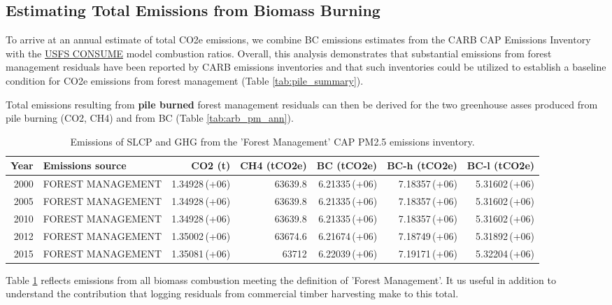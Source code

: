 \documentclass[a4paper,titlepage]{article}
\begin{document}
\subsection{Estimating Total Emissions from Biomass Burning}
\label{sec:orgheadline9}
\label{sec:pile_emissions}

To arrive at an annual estimate of total \ac{CO2e} emissions, we combine \ac{BC} emissions estimates from the \ac{CARB} \ac{CAP} Emissions Inventory with the  \href{http://www.fs.fed.us/pnw/fera/research/smoke/consume/index.shtml}{USFS CONSUME} model combustion ratios. Overall, this analysis demonstrates that substantial emissions from forest management residuals have been reported by CARB emissions inventories and that such inventories could be utilized to establish a baseline condition for \ac{CO2e} emissions from forest management (Table \ref{tab:pile_summary}). 

Total emissions resulting from \textbf{pile burned} forest management residuals
can then be derived for the two greenhouse asses produced from pile
burning (CO2, CH4) and from BC (Table \ref{tab:arb_pm_ann}).

\begin{table}[htb]
\centering
\begin{tabular}{rlrrrrr}
Year & Emissions source & CO2 (t) & CH4 (tCO2e) & BC (tCO2e) & BC-h (tCO2e) & BC-l (tCO2e)\\
\hline
2000 & FOREST MANAGEMENT & 1.34928\,(+06) & 63639.8 & 6.21335\,(+06) & 7.18357\,(+06) & 5.31602\,(+06)\\
2005 & FOREST MANAGEMENT & 1.34928\,(+06) & 63639.8 & 6.21335\,(+06) & 7.18357\,(+06) & 5.31602\,(+06)\\
2010 & FOREST MANAGEMENT & 1.34928\,(+06) & 63639.8 & 6.21335\,(+06) & 7.18357\,(+06) & 5.31602\,(+06)\\
2012 & FOREST MANAGEMENT & 1.35002\,(+06) & 63674.6 & 6.21674\,(+06) & 7.18749\,(+06) & 5.31892\,(+06)\\
2015 & FOREST MANAGEMENT & 1.35081\,(+06) & 63712 & 6.22039\,(+06) & 7.19171\,(+06) & 5.32204\,(+06)\\
\end{tabular}
\caption{\label{tab:orgtable2}
Emissions of \ac{SLCP} and \ac{GHG} from the 'Forest Management' \ac{CAP} \ac{PM2.5} emissions inventory. \label{tab:ghg_slcp}}

\end{table}

Table \ref{tab:ghg_slcp} reflects emissions from all biomass combustion meeting the definition of 'Forest Management'. It us useful in addition to understand the contribution that logging residuals from commercial timber harvesting make to this total.
\end{document}
